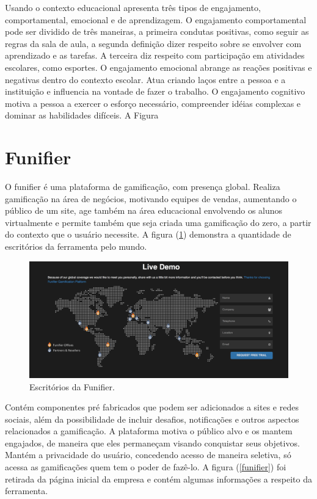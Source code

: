 Usando o contexto educacional \cite{fredericks2004school} apresenta três tipos de engajamento, comportamental, emocional e de aprendizagem.
O engajamento comportamental pode ser dividido de três maneiras, a primeira condutas positivas, como seguir as regras da sala de aula, a segunda definição dizer respeito sobre se envolver com aprendizado e as tarefas. A terceira diz respeito com participação em atividades escolares, como esportes. O engajamento emocional abrange as reações positivas e negativas dentro do contexto escolar. Atua criando laços entre a pessoa e a instituição e influencia na vontade de fazer o trabalho. O engajamento cognitivo  motiva a pessoa a exercer o esforço necessário, compreender idéias complexas e dominar as habilidades difíceis. A Figura


\section{Funifier}

O funifier é uma plataforma de gamificação, com presença global. Realiza gamificação na área de negócios, motivando equipes de vendas, aumentando o público de um site, age também na área educacional envolvendo os alunos virtualmente e permite também que seja criada uma gamificação do zero, a partir do contexto que o usuário necessite. A figura (\ref{globalfig}) demonstra a quantidade de escritórios da ferramenta pelo mundo.


\begin{figure}[h]
	\centering
		\includegraphics[keepaspectratio=true,scale=0.3]{figuras/globalfig.png}
	\caption{Escritórios da Funifier.\label{globalfig}
}
\end{figure}


Contém componentes pré fabricados que podem ser adicionados a sites e redes sociais, além da possibilidade de incluir desafios, notificações e outros aspectos relacionados a gamificação. A plataforma motiva o público alvo e os mantem engajados, de maneira que eles permaneçam visando conquistar seus objetivos. Mantém a privacidade do usuário, concedendo acesso de maneira seletiva, só acessa as gamificações quem tem o poder de fazê-lo. A figura (\ref{funifier}) foi retirada da página inicial da empresa e contém algumas informações a respeito da ferramenta.


